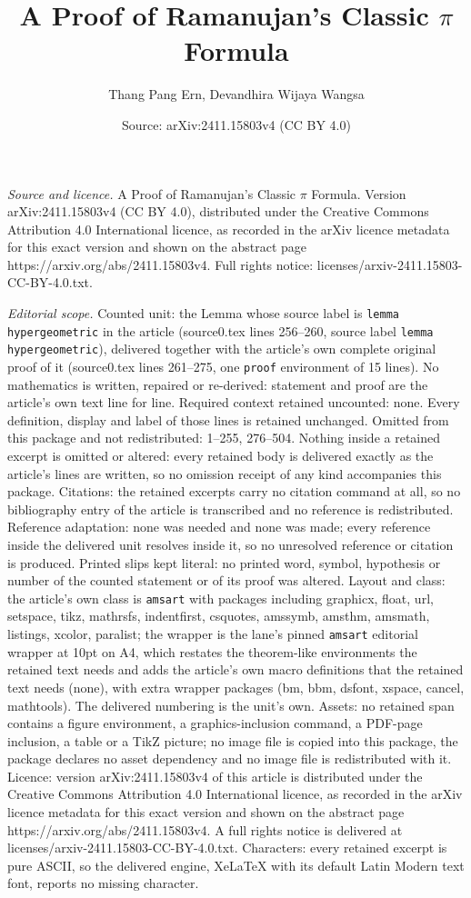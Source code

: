 \documentclass[10pt,a4paper]{amsart}
\title[A Proof of Ramanujan's Classic $\pi$ Formula]{A Proof of Ramanujan's Classic $\pi$ Formula}
\author{Thang Pang Ern, Devandhira Wijaya Wangsa}
\date{Source: arXiv:2411.15803v4 (CC BY 4.0)}
\begin{document}
\maketitle

\noindent\emph{Source and licence.} A Proof of Ramanujan's Classic $\pi$ Formula. Version arXiv:2411.15803v4 (CC BY 4.0), distributed under the Creative Commons Attribution 4.0 International licence, as recorded in the arXiv licence metadata for this exact version and shown on the abstract page https://arxiv.org/abs/2411.15803v4. Full rights notice: licenses/arxiv-2411.15803-CC-BY-4.0.txt.\par\smallskip

\noindent\textit{Editorial scope.} Counted unit: the Lemma whose source label is \texttt{lemma hypergeometric} in the article (source0.tex lines 256--260, source label \texttt{lemma hypergeometric}), delivered together with the article's own complete original proof of it (source0.tex lines 261--275, one \texttt{proof} environment of 15 lines). No mathematics is written, repaired or re-derived: statement and proof are the article's own text line for line. Required context retained uncounted: none. Every definition, display and label of those lines is retained unchanged. Omitted from this package and not redistributed: 1--255, 276--504. Nothing inside a retained excerpt is omitted or altered: every retained body is delivered exactly as the article's lines are written, so no omission receipt of any kind accompanies this package. Citations: the retained excerpts carry no citation command at all, so no bibliography entry of the article is transcribed and no reference is redistributed. Reference adaptation: none was needed and none was made; every reference inside the delivered unit resolves inside it, so no unresolved reference or citation is produced. Printed slips kept literal: no printed word, symbol, hypothesis or number of the counted statement or of its proof was altered. Layout and class: the article's own class is \texttt{amsart} with packages including graphicx, float, url, setspace, tikz, mathrsfs, indentfirst, csquotes, amssymb, amsthm, amsmath, listings, xcolor, paralist; the wrapper is the lane's pinned \texttt{amsart} editorial wrapper at 10pt on A4, which restates the theorem-like environments the retained text needs and adds the article's own macro definitions that the retained text needs (none), with extra wrapper packages (bm, bbm, dsfont, xspace, cancel, mathtools). The delivered numbering is the unit's own. Assets: no retained span contains a figure environment, a graphics-inclusion command, a PDF-page inclusion, a table or a TikZ picture; no image file is copied into this package, the package declares no asset dependency and no image file is redistributed with it. Licence: version arXiv:2411.15803v4 of this article is distributed under the Creative Commons Attribution 4.0 International licence, as recorded in the arXiv licence metadata for this exact version and shown on the abstract page https://arxiv.org/abs/2411.15803v4. A full rights notice is delivered at licenses/arxiv-2411.15803-CC-BY-4.0.txt. Characters: every retained excerpt is pure ASCII, so the delivered engine, XeLaTeX with its default Latin Modern text font, reports no missing character.
\end{document}
